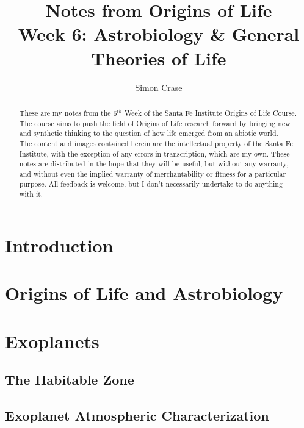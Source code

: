 \documentclass[]{article}
\title{
	Notes from Origins of Life\\
	Week 6: Astrobiology \& General Theories of Life
}
\author{Simon Crase}
\begin{document}
\maketitle

\begin{abstract}
   These are my notes from the $6^{th}$ Week of the Santa Fe Institute Origins of Life Course\cite{sfi2019}. The course aims to push the field of Origins of Life research forward by bringing new and synthetic thinking to the question of how life emerged from an abiotic world.\\
   The content and images contained herein are the intellectual property of the Santa Fe Institute, with the exception of any errors in transcription, which are my own.
   These notes are distributed in the hope that they will be useful,
   but without any warranty, and without even the implied warranty of
   merchantability or fitness for a particular purpose. All feedback is welcome,
   but I don't necessarily undertake to do anything with it.

\end{abstract}

\setcounter{tocdepth}{2}
\tableofcontents

\listoffigures

\section{Introduction}

\section{Origins of Life and Astrobiology}

\section{Exoplanets}

\subsection{The Habitable Zone}

\cite{fujii2018exoplanet}
\cite{villanueva2015unique}
\cite{kasting1993habitable}
\cite{kopparapu2013habitable}
\cite{nasa2019Explonet}

\subsection{Exoplanet Atmospheric Characterization}
\end{document}
